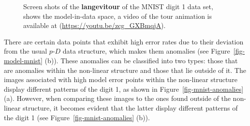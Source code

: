 \documentclass[
  12pt]{article}
\newcommand\pD{$p\text{-}D$}
\begin{document}
\begin{figure}[H]
\begin{minipage}{0.33\linewidth}
{}

\subcaption{\label{fig-mnist1-sc2}}

\end{minipage}%
%
\begin{minipage}{0.33\linewidth}


\subcaption{\label{fig-mnist1-sc3}}

\end{minipage}%

\caption{\label{fig-mnist1-sc}Screen shots of the \textbf{langevitour}
of the MNIST digit 1 data set, shows the model-in-data space, a video of
the tour animation is available at
(\url{https://youtu.be/zcg_GXBmqjA}).}

\end{figure}%

There are certain data points that exhibit high error rates due to their
deviation from the usual \pD{} data structure, which makes them
anomalies (see Figure~\ref{fig-model-mnist} (b)). These anomalies can be
classified into two types: those that are anomalies within the
non-linear structure and those that lie outside of it. The images
associated with high model error points within the non-linear structure
display different patterns of the digit 1, as shown in
Figure~\ref{fig-mnist-anomalies} (a). However, when comparing these
images to the ones found outside of the non-linear structure, it becomes
evident that the latter display different patterns of the digit 1 (see
Figure~\ref{fig-mnist-anomalies} (b)).
\end{document}
